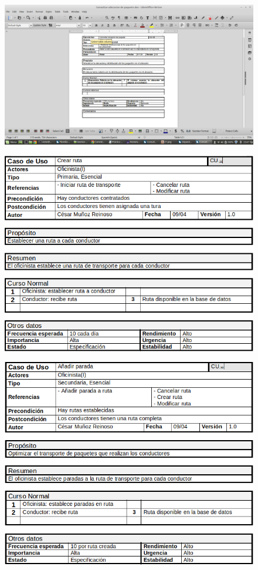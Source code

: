 \begin{figure}[H]
	\centering
	\includegraphics[width=16cm]{28}
\end{figure}
\begin{figure}[H]
	\centering
	\includegraphics[width=16cm]{29}
\end{figure}
\begin{figure}[H]
	\centering
	\includegraphics[width=16cm]{30}
\end{figure}
